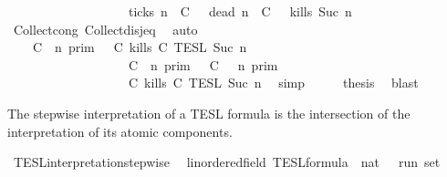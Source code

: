 \begin{isabellebody}
\ \ \ \ \ \ \ \ \ \ \ \ \ \ \ \ \ {\isasymunion}\ {\isacharbraceleft}{\isasymrho}{\isachardot}\ {\isacharquery}ticks\ n\ {\isasymrho}\ C\ {\isasyminter}\ {\isacharbraceleft}{\isasymrho}{\isachardot}\ {\isacharquery}dead\ n\ {\isasymrho}\ C\ {\isasyminter}\ {\isacharbraceleft}{\isasymrho}{\isachardot}\ {\isacharquery}kills\ {\isacharparenleft}Suc\ n{\isacharparenright}\ {\isasymrho}{\isacharbraceright}{\isacartoucheclose}\isanewline
\ \ \ \ \isamarkupfalse%
\ Collect{\isacharunderscore}cong\ Collect{\isacharunderscore}disj{\isacharunderscore}eq\ \isamarkupfalse%
\ auto\isanewline
\ \ \isamarkupfalse%
\ \isamarkupfalse%
\ {\isacartoucheopen}{\isachardot}{\isachardot}{\isachardot}\ {\isacharequal}\ {\isasymlbrakk}\ C\ {\isasymnot}{\isasymUp}\ n\ {\isasymrbrakk}\isactrlsub p\isactrlsub r\isactrlsub i\isactrlsub m\ {\isasyminter}\ {\isasymlbrakk}\ C\ kills\ C\ {\isasymrbrakk}\isactrlsub T\isactrlsub E\isactrlsub S\isactrlsub L\isactrlbsup {\isasymge}\ Suc\ n\isactrlesup \isanewline
\ \ \ \ \ \ \ \ \ \ \ \ \ \ \ \ \ {\isasymunion}\ {\isasymlbrakk}\ C\ {\isasymUp}\ n\ {\isasymrbrakk}\isactrlsub p\isactrlsub r\isactrlsub i\isactrlsub m\ {\isasyminter}\ {\isasymlbrakk}\ C\ {\isasymnot}{\isasymUp}\ {\isasymge}\ n\ {\isasymrbrakk}\isactrlsub p\isactrlsub r\isactrlsub i\isactrlsub m\isanewline
\ \ \ \ \ \ \ \ \ \ \ \ \ \ \ \ \ {\isasyminter}\ {\isasymlbrakk}\ C\ kills\ C\ {\isasymrbrakk}\isactrlsub T\isactrlsub E\isactrlsub S\isactrlsub L\isactrlbsup {\isasymge}\ Suc\ n\isactrlesup {\isacartoucheclose}\ \isamarkupfalse%
\ simp\isanewline
\ \ \isamarkupfalse%
\ \isamarkupfalse%
\ {\isacharquery}thesis\ \isamarkupfalse%
\ blast\isanewline
{}\isamarkupfalse%
%
\endisatagproof
{\isafoldproof}%
%
\isadelimproof
%
\endisadelimproof
%
\begin{isamarkuptext}%
The stepwise interpretation of a TESL formula is the intersection of the
  interpretation of its atomic components.%
\end{isamarkuptext}\isamarkuptrue%
\isamarkupfalse%
\ TESL{\isacharunderscore}interpretation{\isacharunderscore}stepwise\isanewline
\ \ {\isacharcolon}{\isacharcolon}{\isacartoucheopen}{\isacharprime}{\isasymtau}{\isacharcolon}{\isacharcolon}linordered{\isacharunderscore}field\ TESL{\isacharunderscore}formula\ {\isasymRightarrow}\ nat\ {\isasymRightarrow}\ {\isacharprime}{\isasymtau}\ run\ set{\isacartoucheclose}\isanewline

\end{isabellebody}
